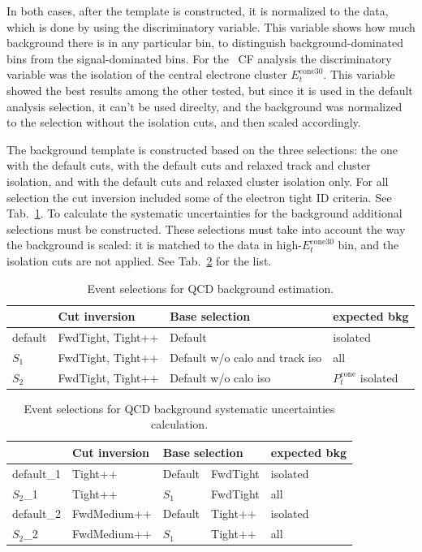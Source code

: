In both cases, after the template is constructed, it is normalized to the data, which is done by using the discriminatory variable. This variable shows how much background there is in any particular bin, to distinguish background-dominated bins from the signal-dominated bins. For the \Zee\ CF analysis the discriminatory variable was the isolation of the central electrone cluster $E_{t}^{\mathrm{cone30}}$. This variable showed the best results among the other tested, but since it is used in the default analysis selection, it can't be used direclty, and the background was normalized to the selection without the isolation cuts, and then scaled accordingly.

The background template is constructed based on the three selections: the one with the default cuts, with the default cuts and relaxed track and cluster isolation, and with the default cuts and relaxed cluster isolation only. For all selection the cut inversion included some of the electron tight ID criteria. See Tab.~\ref{tab:bkg_qcd_samples}. To calculate the systematic uncertainties for the background additional selections must be constructed. These selections must take into account the way the background is scaled: it is matched to the data in high-$E_{t}^{\mathrm{cone30}}$ bin, and the isolation cuts are not applied. See Tab.~\ref{tab:bkg_qcd_unc_samples} for the list.

\begin{table}
\centering
\begin{tabular}{ llll } \hline \hline
    & Cut inversion  &   Base selection    & expected bkg  \\ \hline
default & FwdTight, Tight++ & Default  & isolated \\
$S_1$   & FwdTight, Tight++ & Default w/o calo and track iso & all \\
$S_2$   & FwdTight, Tight++ & Default w/o calo iso       & $P_{t}^{\mathrm{cone}}$ isolated\\
\hline \hline
\end{tabular}
\caption{Event selections for QCD background estimation.}
\label{tab:bkg_qcd_samples}
\end{table}
\begin{table}
\centering
\begin{tabular}{ lll@{ w/o }ll } \hline \hline
    & Cut inversion  &  \multicolumn{2}{l}{Base selection}    & expected bkg \\ \hline
default\_1 & Tight++     & Default & FwdTight  & isolated \\
$S_2$\_1     & Tight++     & $S_1$ & FwdTight      & all \\
default\_2 & FwdMedium++ & Default & Tight++   & isolated \\
$S_2$\_2     & FwdMedium++ & $S_1$ & Tight++       & all \\
\hline \hline
\end{tabular}
\caption{Event selections for QCD background systematic uncertainties calculation.}
\label{tab:bkg_qcd_unc_samples}
\end{table}

